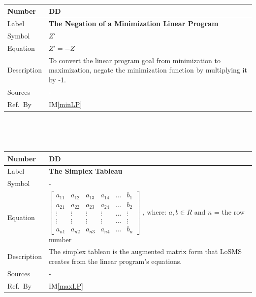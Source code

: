 \documentclass[12pt]{article}
\newcommand{\colAwidth}{0.13\textwidth}
\newcommand{\colBwidth}{0.82\textwidth}
\newcounter{defnum} %
\newcounter{datadefnum} %
\newcommand{\iref}[1]{IM\ref{#1}}
\newcommand{\famname}{LoSMS} %
\begin{document}
\noindent
\begin{minipage}{\textwidth}
	\renewcommand*{\arraystretch}{1.5}
	\begin{tabular}{| p{\colAwidth} | p{\colBwidth}|}
		\hline
		\rowcolor[gray]{0.9}
		Number& DD{datadefnum}\thedatadefnum 
		\label{minToMax}\\
		\hline
		Label& \bf The Negation of a Minimization Linear Program\\
		\hline
		Symbol & $Z'$\\
		\hline
		Equation& $Z' = -Z$\\
		\hline
		Description & 
		To convert the linear program goal from minimization to maximization, 
		negate the minimization function by multiplying it by -1.
		\\
		\hline
		Sources& -\\
		\hline
		Ref.\ By & \iref{minLP}\\
		\hline
	\end{tabular}
\end{minipage}\\


~\newline

\noindent
\begin{minipage}{\textwidth}
	\renewcommand*{\arraystretch}{1.5}
	\begin{tabular}{| p{\colAwidth} | p{\colBwidth}|}
		\hline
		\rowcolor[gray]{0.9}
		Number& DD{datadefnum}\thedatadefnum 
		\label{simplexTableau}\\
		\hline
		Label& \bf The Simplex Tableau\\
		\hline
		Symbol & - \\
		\hline
		Equation& $\begin{bmatrix}
		a_{11} & a_{12} & a_{13} & a_{14} & \dots & b_{1}\\
		a_{21} & a_{22} & a_{23} & a_{24} & \dots & b_{2}\\
		\vdots & \vdots & \vdots & \vdots & \dots & \vdots\\
		\vdots & \vdots & \vdots & \vdots & \dots & \vdots\\
		a_{n1} & a_{n2} & a_{n3} & a_{n4} & \dots & b_{n}	
		\end{bmatrix}$ , where: $a, b \in R$ and $n$ = the row number\\
		\hline
		Description & 
		The simplex tableau is the augmented matrix form that \famname{} 
		creates from the linear program's equations.\\
		\hline
		Sources& -\\
		\hline
		Ref.\ By & \iref{maxLP}\\
		\hline
	\end{tabular}
\end{minipage}\\
~\newline
\end{document}
